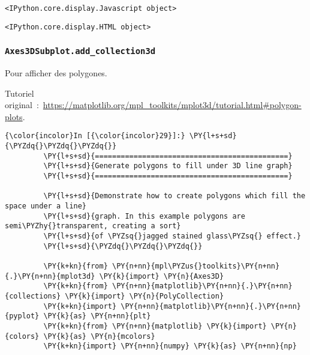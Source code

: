     
    \begin{verbatim}
<IPython.core.display.Javascript object>
    \end{verbatim}

    
    
    \begin{verbatim}
<IPython.core.display.HTML object>
    \end{verbatim}

    
    \hypertarget{axes3dsubplot.add_collection3d}{%
\subsubsection{\texorpdfstring{\texttt{Axes3DSubplot.add\_collection3d}}{Axes3DSubplot.add\_collection3d}}\label{axes3dsubplot.add_collection3d}}

    Pour afficher des polygones.

    Tutoriel
original~:~\url{https://matplotlib.org/mpl_toolkits/mplot3d/tutorial.html\#polygon-plots}.

    \begin{Verbatim}[commandchars=\\\{\}]
{\color{incolor}In [{\color{incolor}29}]:} \PY{l+s+sd}{\PYZdq{}\PYZdq{}\PYZdq{}}
         \PY{l+s+sd}{=============================================}
         \PY{l+s+sd}{Generate polygons to fill under 3D line graph}
         \PY{l+s+sd}{=============================================}
         
         \PY{l+s+sd}{Demonstrate how to create polygons which fill the space under a line}
         \PY{l+s+sd}{graph. In this example polygons are semi\PYZhy{}transparent, creating a sort}
         \PY{l+s+sd}{of \PYZsq{}jagged stained glass\PYZsq{} effect.}
         \PY{l+s+sd}{\PYZdq{}\PYZdq{}\PYZdq{}}
         
         \PY{k+kn}{from} \PY{n+nn}{mpl\PYZus{}toolkits}\PY{n+nn}{.}\PY{n+nn}{mplot3d} \PY{k}{import} \PY{n}{Axes3D}
         \PY{k+kn}{from} \PY{n+nn}{matplotlib}\PY{n+nn}{.}\PY{n+nn}{collections} \PY{k}{import} \PY{n}{PolyCollection}
         \PY{k+kn}{import} \PY{n+nn}{matplotlib}\PY{n+nn}{.}\PY{n+nn}{pyplot} \PY{k}{as} \PY{n+nn}{plt}
         \PY{k+kn}{from} \PY{n+nn}{matplotlib} \PY{k}{import} \PY{n}{colors} \PY{k}{as} \PY{n}{mcolors}
         \PY{k+kn}{import} \PY{n+nn}{numpy} \PY{k}{as} \PY{n+nn}{np}
\end{Verbatim}


